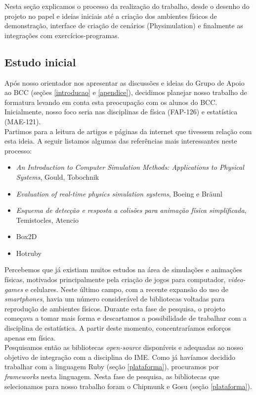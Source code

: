 Nesta seção explicamos o processo da realização do trabalho, desde o desenho do projeto no papel e ideias iniciais até a criação dos ambientes físicos de demonstração, interface de criação de cenários (Physimulation) e finalmente as integrações com exercícios-programas.

\subsection{Estudo inicial}
Após nosso orientador nos apresentar as discussões e ideias do Grupo de Apoio ao BCC (seções \ref{introducao} e \ref{apendice}), decidimos planejar nosso trabalho de formatura levando em conta esta preocupação com os alunos do BCC. Inicialmente, nosso foco seria nas disciplinas de física (FAP-126) e estatística (MAE-121). \\

Partimos para a leitura de artigos e páginas da internet que tivessem relação com esta ideia. A seguir listamos algumas das referências mais interessantes neste processo:
\begin{itemize}
	\item \textit{An Introduction to Computer Simulation Methods: Applications to Physical Systems}, Gould, Tobochnik
	\item \textit{Evaluation of real-time physics simulation systems}, Boeing e Bräunl
	\item \textit{Esquema de detecção e resposta a colisões para animação física simplificada}, Temistocles, Atencio
  \item Box2D \cite{box2d}
  \item Hotruby \cite{hotruby}
\end{itemize}

Percebemos que já existiam muitos estudos na área de simulações e animações físicas, motivados principalmente pela criação de jogos para computador, \textit{video-games} e celulares. Neste último campo, com a recente expansão do uso de \textit{smartphones}, havia um número considerável de bibliotecas voltadas para reprodução de ambientes físicos. Durante esta fase de pesquisa, o projeto começava a tomar mais forma e descartamos a possibilidade de trabalhar com a disciplina de estatística. A partir deste momento, concentraríamos esforços apenas em física. \\

Pesquisamos então as bibliotecas \textit{open-source} disponíveis e adequadas ao nosso objetivo de integração com a disciplina do IME.
Como já havíamos decidido trabalhar com a linguagem Ruby (seção \ref{plataforma}), procuramos por \textit{frameworks} nesta linguagem. Nesta fase de pesquisa, as bibliotecas que selecionamos para nosso trabalho foram o Chipmunk e Gosu (seção \ref{plataforma}). 

